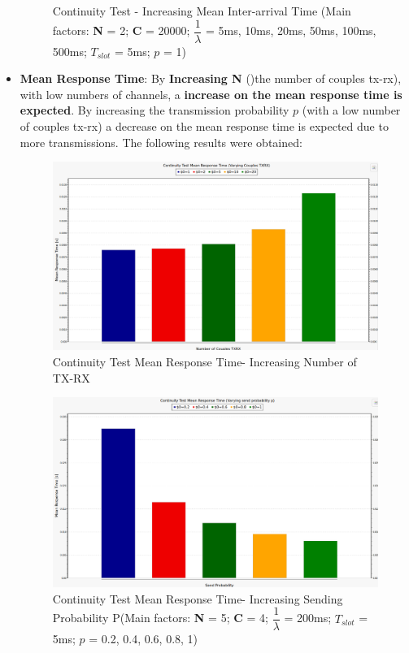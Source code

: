 \begin{itemize}
\begin{figure}[H]
		\caption{Continuity Test - Increasing Mean Inter-arrival Time (Main factors: \textbf{N} = 2; \textbf{C} = 20000; $\dfrac{1}{\lambda}$ = 5ms, 10ms, 20ms, 50ms, 100ms, 500ms; $T_{slot}$ = 5ms; $p$ = 1)}
		\label {img: continuityTestThLambda}
	\end{figure}
	\item \textbf{Mean Response Time}: By \textbf{Increasing N} ()the number of couples tx-rx), with low numbers of channels, a \textbf{increase on the mean response time is expected}. By increasing the transmission probability $p$ (with a low number of couples tx-rx) a decrease on the mean response time is expected due to more transmissions. The following results were obtained:
	\begin{figure}[H]
		\centering
		\includegraphics[width=\textwidth]{img/ContinuityTest_ResponseTIme_TXRXVarying}
		\caption{Continuity Test Mean Response Time- Increasing Number of TX-RX}
		\label {img: continuityTestTXRXResponse}
	\end{figure}
	\begin{figure}[H]
		\centering
		\includegraphics[width=\textwidth]{img/ContinuityTest_ResponseTIme_VaryingP.png}
		\caption{Continuity Test Mean Response Time- Increasing Sending Probability P(Main factors: \textbf{N} = 5; \textbf{C} = 4; $\dfrac{1}{\lambda}$ = 200ms; $T_{slot}$ = 5ms; $p$ = 0.2, 0.4, 0.6, 0.8, 1)}
		\label {img: continuityTestResponseLambda}
	\end{figure}
\end{itemize} 
